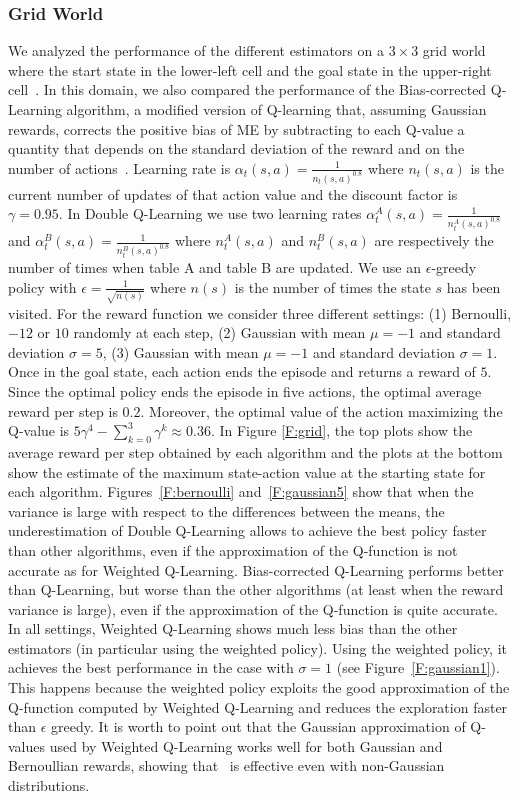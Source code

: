 \subsubsection{Grid World}
We analyzed the performance of the different estimators on a $3 \times 3$ grid world where the start state in the lower-left cell and the goal state in the upper-right cell~\cite{van2010double}. 
In this domain, we also compared the performance of the Bias-corrected Q-Learning algorithm, a modified version of Q-learning that, assuming Gaussian rewards, corrects the positive bias of ME by subtracting to each Q-value a quantity that depends on the standard deviation of the reward and on the number of actions~\cite{lee2012intelligent,lee2013bias}.
Learning rate is $\alpha_t(s, a) = \frac{1}{n_t(s, a)^{0.8}}$ where $n_t(s, a)$ is the current number of updates of that action value and the discount factor is $\gamma = 0.95$. 
In Double Q-Learning we use two learning rates $\alpha_t^A(s, a) = \frac{1}{n_t^A(s, a)^{0.8}}$ and $\alpha_t^B(s, a) = \frac{1}{n_t^B(s, a)^{0.8}}$ where $n_t^A(s, a)$ and $n_t^B(s, a)$ are respectively the number of times when table A and table B are updated. 
We use an $\epsilon$-greedy policy with $\epsilon = \frac{1}{\sqrt{n(s)}}$ where $n(s)$ is the number of times the state $s$ has been visited. 
For the reward function we consider three different settings: (1) Bernoulli, $-12$ or $10$ randomly at each step, (2) Gaussian with mean $\mu = -1$ and standard deviation $\sigma = 5$, (3) Gaussian with mean $\mu = -1$ and standard deviation $\sigma = 1$. 
Once in the goal state, each action ends the episode and returns a reward of $5$. Since the optimal policy ends the episode in five actions, the optimal average reward per step is $0.2$. Moreover, the optimal value of the action maximizing the Q-value is $5\gamma^4 - \sum_{k=0}^3 \gamma^k \approx 0.36$.
In Figure \ref{F:grid}, the top plots show the average reward per step obtained by each algorithm and the plots at the bottom show the estimate of the maximum state-action value at the starting state for each algorithm.
Figures~\ref{F:bernoulli} and~\ref{F:gaussian5} show that when the variance is large with respect to the differences between the means, the underestimation of Double Q-Learning allows to achieve the best policy faster than other algorithms, even if the approximation of the Q-function is not accurate as for Weighted Q-Learning. 
Bias-corrected Q-Learning performs better than Q-Learning, but worse than the other algorithms (at least when the reward variance is large), even if the approximation of the Q-function is quite accurate.
In all settings, Weighted Q-Learning shows much less bias than the other estimators (in particular using the weighted policy). Using the weighted policy, it achieves the best performance in the case with $\sigma = 1$ (see Figure~\ref{F:gaussian1}). This happens because the weighted policy exploits the good approximation of the Q-function computed by Weighted Q-Learning and reduces the exploration faster than $\epsilon$ greedy. It is worth to point out that the Gaussian approximation of Q-values used by Weighted Q-Learning works well for both Gaussian and Bernoullian rewards, showing that \WE~is effective even with non-Gaussian distributions.


